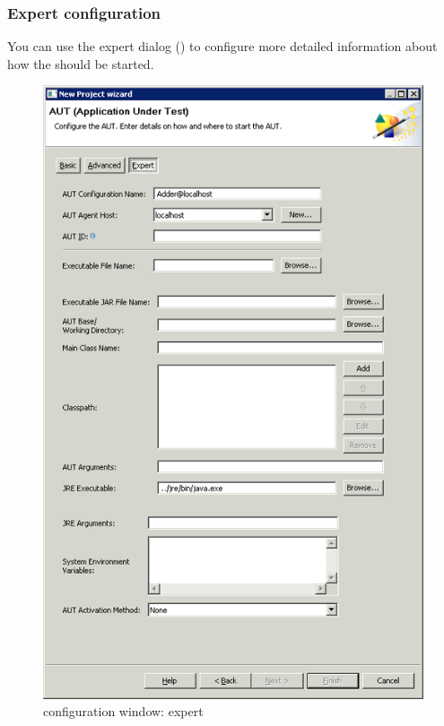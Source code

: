 \subsubsection{Expert \gdaut{} configuration}
\label{ExpertAUTConfig}
You can use the expert dialog () to configure more detailed information about how the \gdaut{} should be started. 

\begin{figure}[h]
\begin{center}
\includegraphics{Tasks/AUTs/PS/autconfigwindow_expert}
\caption{\gdaut configuration window: expert}
\label{autconfigexpert}
\end{center}
\end{figure}

